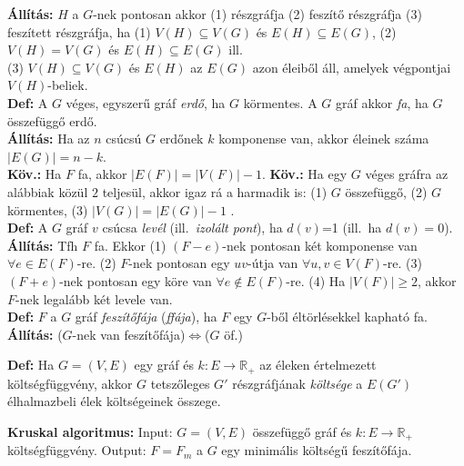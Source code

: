 \documentclass[a4paper]{article}
\newcommand{\0}{{\bf 0}}
\newcommand{\R}{{\mathbb R}}
\newcommand{\all}{{\bf Állítás:} }
\newcommand{\kov}{{\bf Köv.:} }
\newcommand{\defi}{{\bf Def:} }
\begin{document}
    \all $H$ a $G$-nek pontosan akkor (1) részgráfja (2) feszítő
    részgráfja (3) feszített részgráfja, ha (1) $V(H)\subseteq V(G)$ és
    $E(H)\subseteq E(G)$, \hfill (2) $V(H)=V(G)$ és $E(H)\subseteq E(G)$ ill.\\
    (3) $V(H)\subseteq V(G)$ és $E(H)$ az $E(G)$ azon éleiből áll, amelyek
    végpontjai $V(H)$-beliek.\\
    \defi A $G$ véges, egyszerű gráf \emph{erdő}, ha $G$ körmentes. A $G$ gráf
    akkor \emph{fa}, ha $G$ összefüggő erdő.\\
    \all Ha az $n$ csúcsú $G$ erdőnek $k$ komponense van, akkor éleinek száma
    $|E(G)|=n-k$.\\
    \kov Ha $F$ fa, akkor $|E(F)|=|V(F)|-1$.
    \kov Ha egy $G$ véges gráfra az alábbiak közül $2$ teljesül, akkor igaz rá
    a harmadik is: (1) $G$ összefüggő, \hfil (2) $G$ körmentes, \hfil (3)
    $|V(G)|=|E(G)|-1$ .\\ 
    \iffalse
    $G$ pontosan akkor fa, ha az alábbiakból
    legalább $2$ teljesül: (1) $G$ összefüggő (2) $G$ körmentes \hfill (3)
    $G$-nek eggyel kevesebb éle van, mint ahány pontja.\\
    \fi
    \defi A $G$ gráf $v$ csúcsa \emph{levél} (ill.\ \emph{izolált pont}), ha
    $d(v)$=1 (ill.\ ha $d(v)=0$).\\
    \all Tfh $F$ fa. Ekkor (1) $(F-e)$-nek pontosan két komponense van $\forall
    e\in E(F)$-re. (2) $F$-nek pontosan egy $uv$-útja van $\forall u,v\in
    V(F)$-re. (3) $(F+e)$-nek pontosan egy köre van $\forall e\not\in 
    E(F)$-re. (4) Ha $|V(F)|\ge 2$, akkor $F$-nek legalább két levele van.\\
    \defi $F$ a $G$ gráf \emph{feszítőfája} (\emph{ffája}), ha $F$ egy $G$-ből
    éltörlésekkel kapható fa.\\
    \all ($G$-nek van feszítőfája)$\iff$($G$ öf.)
    
    
    \iffalse
    \defi Ha $G=(V,E)$ egy gráf és $k:E\to\R_+$ az éleken értelmezett
    költségfüggvény, akkor $G$ tetszőleges $G'$ részgráfjának \emph{költsége} a
    $E(G')$ élhalmazbeli élek költségeinek összege.
    
    {\bf Kruskal algoritmus:} Input: $G=(V,E)$ összefüggő gráf és $k:E\to\R_+$
    költségfüggvény. Output: $F=F_m$ a $G$ egy minimális költségű feszítőfája.
     
\end{document}
